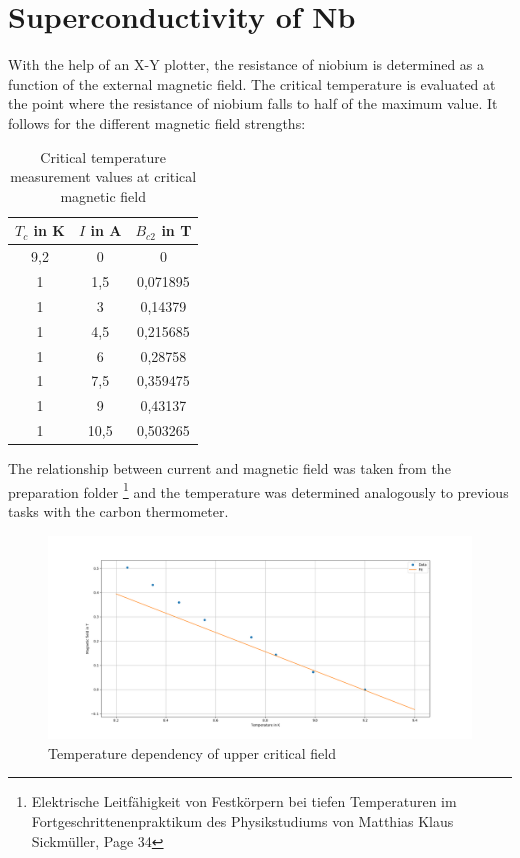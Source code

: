 

\section{Superconductivity of Nb}

With the help of an X-Y plotter, the resistance of niobium is determined as a function of the external magnetic field. The critical temperature is evaluated at the point where the resistance of niobium falls to half of the maximum value. It follows for the different magnetic field strengths:
\begin{table}
    \centering
    \caption{Critical temperature measurement values at critical magnetic field}
    \begin{tabular}{c|c|c}
        $ T_c$ in K&$I$ in A&$B_{c2}$ in T  \\
         \hline
         9,2& 0&0\\
        1 &1,5&0,071895 \\
         1&3&0,14379 \\
         1&4,5&0,215685\\
         1&6&0,28758 \\
         1&7,5&0,359475 \\
         1&9&0,43137 \\
         1&10,5&0,503265 \\
    \end{tabular}
    \label{tab:Niob_critical}
\end{table}

The relationship between current and magnetic field was taken from the preparation folder
\footnote{Elektrische Leitfähigkeit von Festkörpern bei tiefen Temperaturen im Fortgeschrittenenpraktikum des Physikstudiums von Matthias Klaus Sickmüller, Page 34}
and the temperature was determined analogously to previous tasks with the carbon thermometer. 
\begin{figure}
    \centering
    \includegraphics[width=1.0\textwidth]{./fig/ex3.png}
    \caption{Temperature dependency of upper critical field}
    \label{fig:Nb_B_T}
\end{figure}

